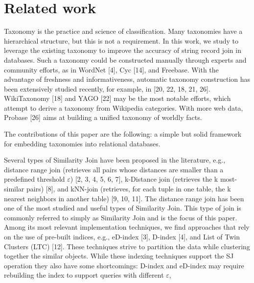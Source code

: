 \section{Related work} \label{sec:relatedwork}

Taxonomy is the practice and science of classification. Many taxonomies have a hierarchical structure, but this is not a requirement. In this work, we study to leverage the existing taxonomy to improve the accuracy of string record join in databases. Such a taxonomy could be constructed manually
through experts and community efforts, as in WordNet
[4], Cyc [14], and Freebase. With the advantage of freshness
and informativeness, automatic taxonomy construction has
been extensively studied recently, for example, in [20, 22,
18, 21, 26]. WikiTaxonomy [18] and YAGO [22] may be the
most notable efforts, which attempt to derive a taxonomy
from Wikipedia categories. With more web data, Probase
[26] aims at building a unified taxonomy of worldly facts.


 The contributions of this paper \cite{journals/vldb/MartinenghiT14}   are the following: a simple but solid framework for embedding taxonomies
into relational databases.




Several types of Similarity Join have been proposed in the
literature, e.g., distance range join (retrieves all pairs whose distances
are smaller than a predefined threshold $\varepsilon$) [2, 3, 4, 5, 6,
7], k-Distance join (retrieves the k most-similar pairs) [8], and
kNN-join (retrieves, for each tuple in one table, the k nearest neighbors
in another table) [9, 10, 11]. The distance range join
has been one of the most studied and useful types of Similarity
Join. This type of join is commonly referred to simply as Similarity
Join and is the focus of this paper. Among its most relevant
implementation techniques, we find approaches that rely
on the use of pre-built indices, e.g., eD-index [3], D-index [4],
and List of Twin Clusters (LTC) [12]. These techniques strive
to partition the data while clustering together the similar objects.
While these indexing techniques support the SJ operation
they also have some shortcomings: D-index and eD-index may
require rebuilding the index to support queries with different $\varepsilon$,

